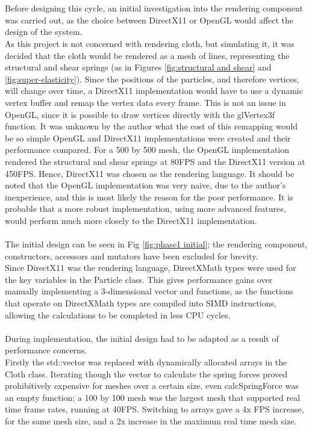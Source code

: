 \\\\Before designing this cycle, an initial investigation into the rendering component was carried out, as the choice between DirectX11 or OpenGL would affect the design of the system.
\\As this project is not concerned with rendering cloth, but simulating it, it was decided that the cloth would be rendered as a mesh of lines, representing the structural and shear springs (as in Figures \ref{fig:structural and shear} and \ref{fig:super-elasticity}). Since the positions of the particles, and therefore vertices, will change over time, a DirectX11 implementation would have to use a dynamic vertex buffer and remap the vertex data every frame. This is not an issue in OpenGL, since it is possible to draw vertices directly with the glVertex3f function. It was unknown by the author what the cost of this remapping would be so simple OpenGL and DirectX11 implementations were created and their performance compared. For a 500 by 500 mesh, the OpenGL implementation rendered the structural and shear springs at 80FPS and the DirectX11 version at 450FPS. Hence, DirectX11 was chosen as the rendering language. It should be noted that the OpenGL implementation was very naive, due to the author's inexperience, and this is most likely the reason for the poor performance. It is probable that a more robust implementation, using more advanced features, would perform much more closely to the DirectX11 implementation.
\\\\The initial design can be seen in Fig \ref{fig:phase1 initial}; the rendering component, constructors, accessors and mutators have been excluded for brevity. 
\\Since DirectX11 was the rendering language, DirectXMath types were used for the key variables in the Particle class. This gives performance gains over manually implementing a 3-dimensional vector and functions, as the functions that operate on DirectXMath types are compiled into SIMD instructions, allowing the calculations to be completed in less CPU cycles.
\\\\During implementation, the initial design had to be adapted as a result of performance concerns. 
\\Firstly the std::vector was replaced with dynamically allocated arrays in the Cloth class. Iterating though the vector to calculate the spring forces proved prohibitively expensive for meshes over a certain size, even calcSpringForce was an empty function; a 100 by 100 mesh was the largest mesh that supported real time frame rates, running at 40FPS. Switching to arrays gave a 4x FPS increase, for the same mesh size, and a 2x increase in the maximum real time mesh size.
